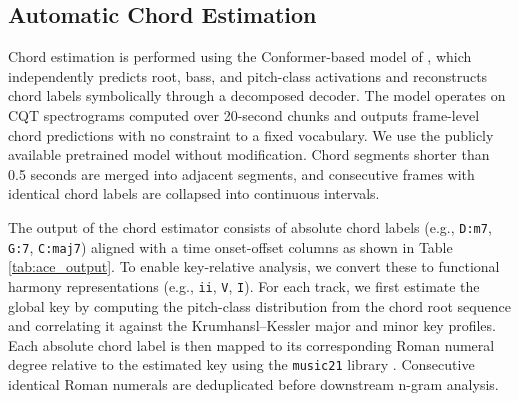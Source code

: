 \documentclass{article}
\begin{document}
\subsection{Automatic Chord Estimation}
\label{sec:ace_pipeline}
Chord estimation is performed using the Conformer-based model of \citep{poltronieri2025discord}, which independently predicts root, bass, and pitch-class activations and reconstructs chord labels symbolically through a decomposed decoder. The model operates on CQT spectrograms computed over 20-second chunks and outputs frame-level chord predictions with no constraint to a fixed vocabulary. We use the publicly available pretrained model without modification. Chord segments shorter than 0.5 seconds are merged into adjacent segments, and consecutive frames with identical chord labels are collapsed into continuous intervals.

The output of the chord estimator consists of absolute chord labels (e.g., \texttt{D:m7}, \texttt{G:7}, \texttt{C:maj7}) aligned with a time onset-offset columns as shown in Table \ref{tab:ace_output}. To enable key-relative analysis, we convert these to functional harmony representations (e.g., \texttt{ii}, \texttt{V}, \texttt{I}). For each track, we first estimate the global key by computing the pitch-class distribution from the chord root sequence and correlating it against the Krumhansl--Kessler major and minor key profiles. Each absolute chord label is then mapped to its corresponding Roman numeral degree relative to the estimated key using the \texttt{music21} library \citep{cuthbert2010music21}. Consecutive identical Roman numerals are deduplicated before downstream n-gram analysis.
\end{document}
